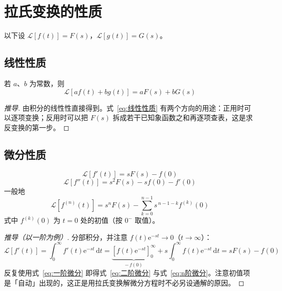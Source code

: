\section{拉氏变换的性质}
\label{sec:拉氏变换的性质}

以下设 $\mathcal{L}[f(t)]=F(s)$，$\mathcal{L}[g(t)]=G(s)$。

\subsection{线性性质}

\begin{property}[线性性质]
若 $a$、$b$ 为常数，则
\begin{equation}
\mathcal{L}\left[af(t)+bg(t)\right]=aF(s)+bG(s)
\label{eq:线性性质}
\end{equation}
\end{property}

\begin{proof}[推导]
由积分的线性性直接得到。式~\eqref{eq:线性性质} 有两个方向的用途：正用时可以逐项变换；反用时可以把 $F(s)$ 拆成若干已知象函数之和再逐项查表，这是求反变换的第一步。
\end{proof}

\subsection{微分性质}

\begin{property}[时域微分]
\begin{equation}
\mathcal{L}\left[f'(t)\right]=sF(s)-f(0)
\label{eq:一阶微分}
\end{equation}
\begin{equation}
\mathcal{L}\left[f''(t)\right]=s^{2}F(s)-sf(0)-f'(0)
\label{eq:二阶微分}
\end{equation}
一般地
\begin{equation}
\mathcal{L}\left[f^{(n)}(t)\right]=s^{n}F(s)-\sum_{k=0}^{n-1}s^{\,n-1-k}f^{(k)}(0)
\label{eq:n阶微分}
\end{equation}
式中 $f^{(k)}(0)$ 为 $t=0$ 处的初值（按 $0^{-}$ 取值）。
\end{property}

\begin{proof}[推导（以一阶为例）]
分部积分，并注意 $f(t)\mathrm{e}^{-st}\to 0$（$t\to\infty$）：
\[
\mathcal{L}\left[f'(t)\right]=\int_{0}^{\infty}f'(t)\mathrm{e}^{-st}\,\mathrm{d}t
=\underbrace{\left[f(t)\mathrm{e}^{-st}\right]_{0}^{\infty}}_{-\,f(0)}+s\int_{0}^{\infty}f(t)\mathrm{e}^{-st}\,\mathrm{d}t=sF(s)-f(0)
\]
反复使用式~\eqref{eq:一阶微分} 即得式~\eqref{eq:二阶微分} 与式~\eqref{eq:n阶微分}。注意初值项是「自动」出现的，这正是用拉氏变换解微分方程时不必另设通解的原因。
\end{proof}

